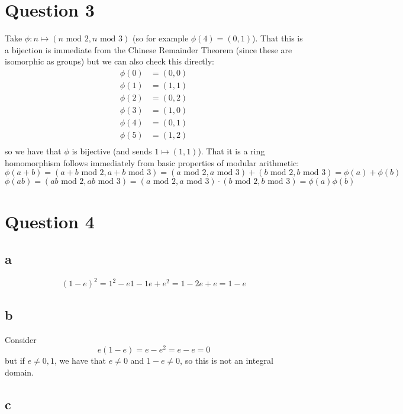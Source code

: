\documentclass[12pt,letterpaper]{article}
\theoremstyle{definition}
\begin{document}
\section*{Question 3}

Take $\phi: n \mapsto (n \text{ mod } 2, n \text{ mod } 3)$ (so for example $\phi(4) = (0, 1)$). That this is a bijection is immediate from the Chinese Remainder Theorem (since these are isomorphic as groups) but we can also check this directly:
\begin{align*}
  \phi(0) &= (0, 0) \\
  \phi(1) &= (1, 1) \\
  \phi(2) &= (0, 2) \\
  \phi(3) &= (1, 0) \\
  \phi(4) &= (0, 1) \\
  \phi(5) &= (1, 2) \\
\end{align*}
so we have that $\phi$ is bijective (and sends $1 \mapsto (1,1)$). That it is a ring homomorphism follows immediately from basic properties of modular arithmetic:
\[
  \phi(a + b) = (a + b \text{ mod } 2, a + b \text{ mod } 3) = (a \text{ mod } 2, a \text{ mod } 3) + (b \text{ mod } 2, b \text{ mod } 3) = \phi(a) + \phi(b)
\]
\[
  \phi(ab) = (ab \text{ mod } 2, ab \text{ mod } 3) = (a \text{ mod } 2, a \text{ mod } 3) \cdot (b \text{ mod } 2, b \text{ mod } 3) = \phi(a)\phi(b)
\]
\section*{Question 4}

\subsection*{a}

\[
  (1 - e)^{2} = 1^{2} - e1 - 1e + e^{2} = 1 - 2e + e = 1 - e
\]

\subsection*{b}

Consider
\[
  e(1 - e) = e - e^{2} = e - e = 0
\]
but if $e \neq 0, 1$, we have that $e \neq 0$ and $1 - e \neq 0$, so this is not an integral domain.

\subsection*{c}
\end{document}
